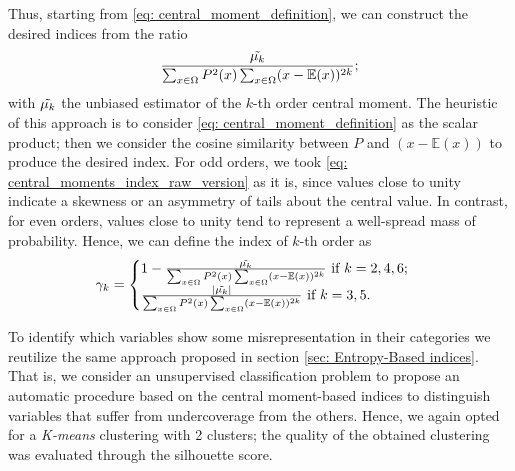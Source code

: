 Thus, starting from \eqref{eq: central_moment_definition}, we can construct the desired indices from the ratio
\begin{equation}\label{eq: central_moments_index_raw_version}
    \frac{\Tilde{\mu_{k}}}{\sum_{x \in \Omega} P^{2}(x)\sum_{x\in\Omega}(x-\mathbb{E}(x))^{2k}};
\end{equation}
with $\Tilde{\mu_{k}}$ the unbiased estimator of the $k$-th order central moment.
The heuristic of this approach is to consider \eqref{eq: central_moment_definition} as the scalar product; then we consider the cosine similarity between $P$ and $(x-\mathbb{E}(x))$ to produce the desired index.
For odd orders, we took \eqref{eq: central_moments_index_raw_version} as it is, since values close to unity indicate a skewness or an asymmetry of tails about the central value.
In contrast, for even orders, values close to unity tend to represent a well-spread mass of probability.
Hence, we can define the index of $k$-th order as
\begin{equation}
\gamma_{k} =
\begin{cases}
    1-\frac{\Tilde{\mu_{k}}}{\sum_{x \in \Omega} P^{2}(x)\sum_{x\in\Omega}(x-\mathbb{E}(x))^{2k}}~\text{if }k=2, 4, 6;\\
    \frac{|\Tilde{\mu_{k}}|}{\sum_{x \in \Omega} P^{2}(x)\sum_{x\in\Omega}(x-\mathbb{E}(x))^{2k}}~\text{if }k=3, 5.\\
\end{cases}
    \end{equation}

To identify which variables show some misrepresentation in their categories we reutilize the same approach proposed in section \ref{sec: Entropy-Based indices}.
That is, we consider an unsupervised classification problem to propose an automatic procedure based on the central moment-based indices to distinguish variables that suffer from undercoverage from the others.
Hence, we again opted for a \emph{K-means} clustering with 2 clusters; the quality of the obtained clustering was evaluated through the silhouette score.

